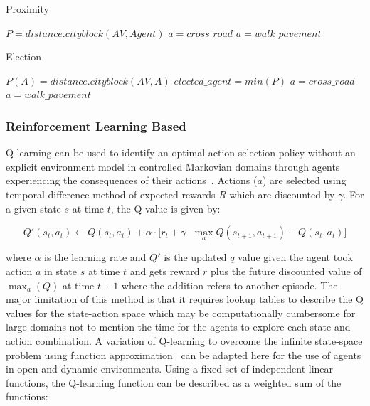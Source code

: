 \documentclass[letterpaper, 10 pt, journal, twoside]{IEEEtran}
\begin{document}
\begin{algorithm}
\caption{Proximity}\label{algo:prox}
\begin{algorithmic}[1]
\State $P = distance.cityblock(AV,Agent)$
    \State $a=cross\_road$
\Else
	\State $a=walk\_pavement$
\EndIf
\EndWhile
\end{algorithmic}
\end{algorithm}

\begin{algorithm}
\caption{Election}\label{algo:elect}
\begin{algorithmic}[1]
	\State $P(A) = distance.cityblock(AV,A)$
\EndFor
		$elected\_agent=min(P)$
	\EndIf
	    \State $a=cross\_road$
	\Else
		\State $a=walk\_pavement$
	\EndIf
\EndWhile
\end{algorithmic}
\end{algorithm}

\subsubsection{Reinforcement Learning Based}
Q-learning can be used to identify an optimal action-selection policy without an explicit environment model in controlled Markovian domains through agents experiencing the consequences of their actions~\cite{watkins1992q}. Actions ($a$) are selected using temporal difference method of expected rewards $R$ which are discounted by $\gamma$. For a given state $s$ at time $t$, the Q value is given by:

\begin{equation*}
Q'(s_t, a_t) \gets Q(s_t, a_t) + \alpha \cdot \big[r_t + \gamma \cdot \max_{a} Q(s_{t+1}, a_{t+1}) - Q(s_t,a_t)\big]
\end{equation*}

where $\alpha$ is the learning rate and $Q'$ is the updated $q$ value given the agent took action $a$ in state $s$ at time $t$ and gets reward $r$ plus the future discounted value of $\max_{a} (Q)$ at time $t+1$ where the addition refers to another episode. The major limitation of this method is that it requires lookup tables to describe the Q values for the state-action space which may be computationally cumbersome for large domains not to mention the time for the agents to explore each state and action combination. A variation of Q-learning to overcome the infinite state-space problem using function approximation~\cite{baird1995residual} can be adapted here for the use of agents in open and dynamic environments. Using a fixed set of independent linear functions, the Q-learning function can be described as a weighted sum of the functions:
\end{document}
